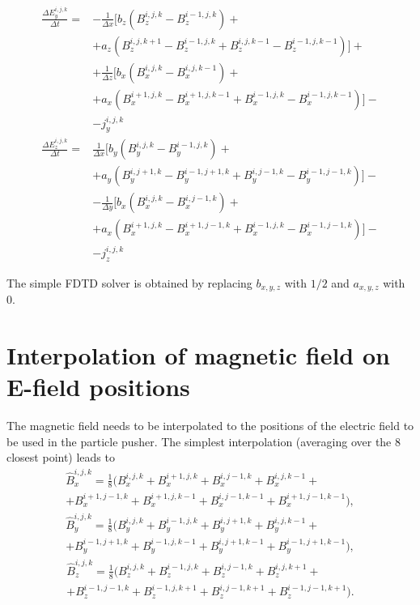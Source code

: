 \documentclass[12pt,a4paper,DIV=calc]{scrartcl}
\begin{document}
\begin{align}
    \frac{\Delta E_y^{i,j,k}}{\Delta t} = &-\frac{1}{\Delta x}\big[b_z\left(B_z^{i,j,k} - B_z^{i-1,j,k}\right) + \nonumber \\
    &+ a_z \left(B_z^{i,j,k+1} - B_z^{i-1,j,k} + B_z^{i,j,k-1} - B_z^{i-1,j,k-1}\right)\big] + \nonumber \\
    &+ \frac{1}{\Delta z}\big[ b_x \left(B_x^{i,j,k} - B_x^{i,j,k-1}\right) + \nonumber \\
    &+ a_x\left(B_x^{i+1,j,k} - B_x^{i+1,j,k-1} + B_x^{i-1,j,k} - B_x^{i-1,j,k-1}\right)\big] - \nonumber \\
    &- j_y^{i,j,k}
\end{align}
\begin{align}
    \frac{\Delta E_z^{i,j,k}}{\Delta t} = &\frac{1}{\Delta x}\big[b_y\left(B_y^{i,j,k} - B_y^{i-1,j,k}\right) + \nonumber \\
    &+ a_y \left(B_y^{i,j+1,k} -B_y^{i-1,j+1,k} + B_y^{i,j-1,k} - B_y^{i-1,j-1,k} \right)\big] - \nonumber \\
    &- \frac{1}{\Delta y}\big[ b_x\left(B_x^{i,j,k} - B_x^{i,j-1,k}\right) + \nonumber \\
    &+ a_x \left(B_x^{i+1,j,k} - B_x^{i+1,j-1,k} + B_x^{i-1,j,k} - B_x^{i-1,j-1,k} \right)\big] - \nonumber \\
    &- j_z^{i,j,k}
\end{align}

The simple FDTD solver is obtained by replacing $b_{x,y,z}$ with $1/2$ and $a_{x,y,z}$ with $0$.

\section{Interpolation of magnetic field on E-field positions}

The magnetic field needs to be interpolated to the positions of the electric field to be used in the particle pusher.
The simplest interpolation (averaging over the 8 closest point) leads to
\begin{multline}
    \hat{B}_x^{i,j,k} = \frac{1}{8} \big(B_x^{i,j,k} + B_x^{i+1,j,k} + B_x^{i,j-1,k} + B_x^{i,j,k-1} + \\
    + B_x^{i+1,j-1,k} + B_x^{i+1,j,k-1} + B_x^{i,j-1,k-1} + B_x^{i+1,j-1,k-1} \big),
\end{multline}
\begin{multline}
    \hat{B}_y^{i,j,k} = \frac{1}{8} \big(B_y^{i,j,k} + B_y^{i-1,j,k} + B_y^{i,j+1,k} + B_y^{i,j,k-1} + \\
    + B_y^{i-1,j+1,k} + B_y^{i-1,j,k-1} + B_y^{i,j+1,k-1} + B_y^{i-1,j+1,k-1} \big),
\end{multline}
\begin{multline}
    \hat{B}_z^{i,j,k} = \frac{1}{8} \big(B_z^{i,j,k} + B_z^{i-1,j,k} + B_z^{i,j-1,k} + B_z^{i,j,k+1} + \\
    + B_z^{i-1,j-1,k} + B_z^{i-1,j,k+1} + B_z^{i,j-1,k+1} + B_z^{i-1,j-1,k+1}\big).
\end{multline}
\end{document}
